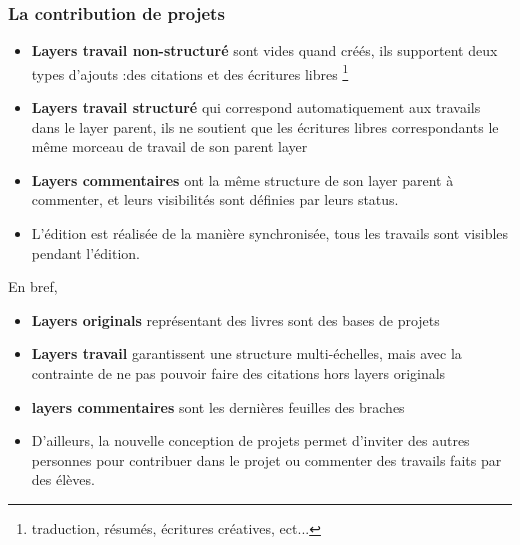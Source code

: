 \subsubsection{La contribution de projets}

\begin{itemize}
    \item \textbf{Layers travail non-structuré} sont vides quand créés, ils supportent deux types d'ajouts :des citations et des écritures libres \footnote{ traduction, résumés, écritures créatives, ect... }
    \item \textbf{Layers travail structuré} qui correspond automatiquement aux travails dans le layer parent, ils ne soutient que les écritures libres correspondants le même morceau de travail de son parent layer
    \item \textbf{Layers commentaires} ont la même structure de son layer parent à commenter, et leurs visibilités sont définies par leurs status.
    \item L'édition est réalisée de la manière synchronisée, tous les travails sont visibles pendant l'édition.
\end{itemize}

En bref, 

\begin{itemize}
    \item \textbf{Layers originals} représentant des livres sont des bases de projets
    \item \textbf{Layers travail} garantissent une structure multi-échelles, mais avec la contrainte de ne pas pouvoir faire des citations hors layers originals
    \item \textbf{layers commentaires} sont les dernières feuilles des braches
    \item D'ailleurs, la nouvelle conception de projets permet d'inviter des autres personnes pour contribuer dans le projet ou commenter des travails faits par des élèves. 
\end{itemize}